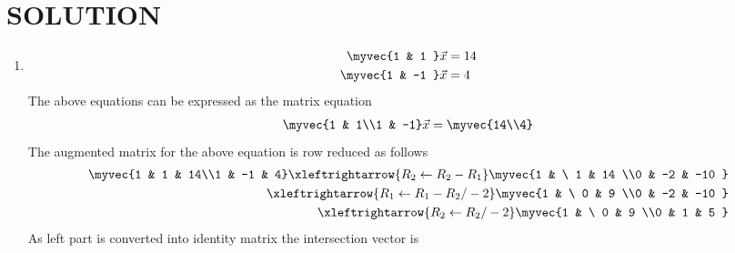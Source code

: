 \documentclass[journal,12pt,twocolumn]{IEEEtran}
\begin{document}
\section{SOLUTION}  
\begin{enumerate}
\item
\begin{align}
\begin{split}
\myvec{1 & 1 }\vec{x}&=14
\\
\myvec{1 & -1 }\vec{x}&=4
\end{split}
\end{align}
The above equations can be expressed as the matrix equation
\begin{align}
\myvec{1 & 1\\1 & -1} \vec{x} = \myvec{14\\4}
\end{align}
%
The augmented matrix for the above equation is row reduced as follows
\begin{align}
\myvec{1 & 1 & 14\\1 & -1 & 4} 
\xleftrightarrow {R_2\leftarrow R_2 -R_1}\myvec{1 & \ 1 & 14 \\0 & -2 & -10 }
\\
\xleftrightarrow {R_1\leftarrow R_1 -R_2/-2}\myvec{1 & \ 0 & 9 \\0 & -2 & -10 }
\\
\xleftrightarrow {R_2\leftarrow R_2/-2}\myvec{1 & \ 0 & 9 \\0 & 1 & 5 }
\end{align}
%
As left part is converted into identity matrix the intersection vector is 


\end{enumerate}
\end{document}
